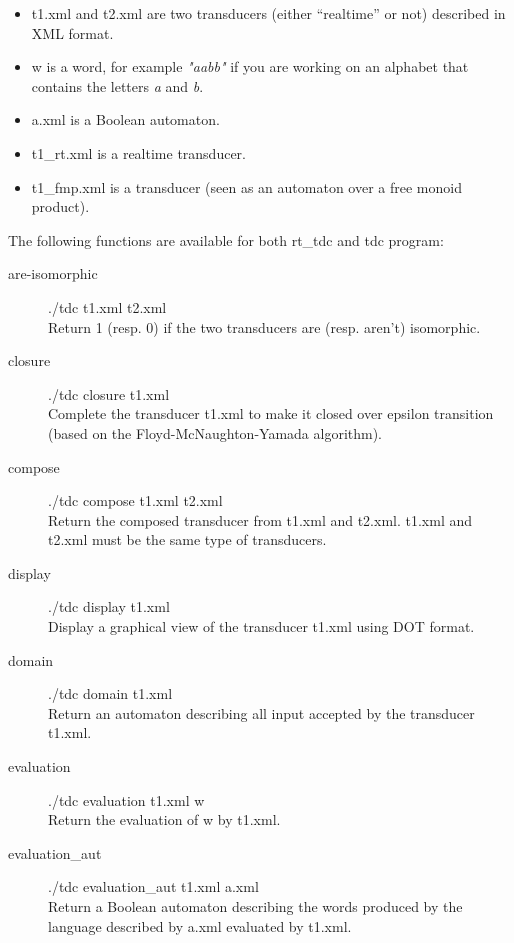 \begin{itemize}
\item t1.xml and t2.xml are two transducers (either ``realtime'' or
  not) described in \Vauc XML format.
\item w is a word, for example \textit{"aabb"} if you are working on an
  alphabet that contains the letters \textit{a} and \textit{b}.
\item a.xml is a Boolean automaton.
\item t1\_rt.xml is a realtime transducer.
\item t1\_fmp.xml is a transducer (seen as an automaton over a free monoid
  product).
\end{itemize}
The following functions are available for both rt\_tdc and tdc program:
\begin{description}
  \item [are-isomorphic]
    ./tdc t1.xml t2.xml\\
    Return 1 (resp. 0) if the two transducers are (resp. aren't)
    isomorphic.

  \item [closure]
    ./tdc closure t1.xml\\
    Complete the transducer t1.xml to make it
    closed over epsilon transition (based on the
    Floyd-McNaughton-Yamada algorithm).

  \item [compose]
    ./tdc compose t1.xml t2.xml\\
    Return the composed transducer from t1.xml and t2.xml. t1.xml and
    t2.xml must be the same type of transducers.

  \item [display]
    ./tdc display t1.xml\\
    Display a graphical view of the transducer t1.xml using DOT format.

  \item [domain]
    ./tdc domain t1.xml\\
    Return an automaton describing all input accepted by the
    transducer t1.xml.

  \item [evaluation]
    ./tdc evaluation t1.xml w\\
    Return the evaluation of w by t1.xml.

  \item [evaluation\_aut]
    ./tdc evaluation\_aut t1.xml a.xml\\
    Return a Boolean automaton describing the words produced by the
    language described by a.xml evaluated by t1.xml.


\end{description}
